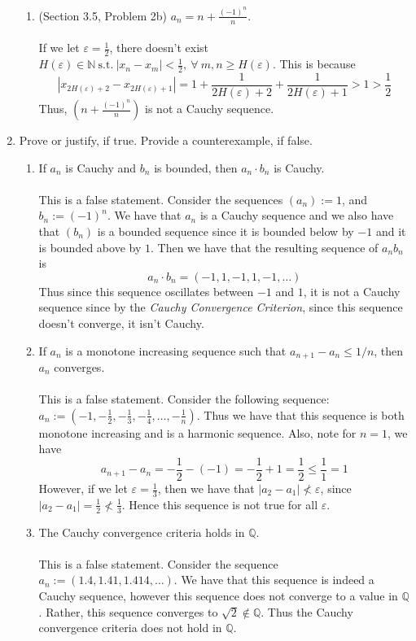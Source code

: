 \documentclass[12pt,letterpaper]{article}
\newcommand{\st}{\ \text{s.t.}\ }
\newcommand{\abs}[1]{\left\lvert #1 \right\rvert}
\newcommand{\N}{\mathbb{N}}
\newcommand{\Q}{\mathbb{Q}}
\theoremstyle{case}
\theoremstyle{definition}
\begin{document}
\begin{enumerate}
\begin{enumerate}
			\item (Section 3.5, Problem 2b) $a_n=n+\frac{(-1)^n}{n}$.
			\\\\If we let $\varepsilon=\frac{1}{2}$, there doesn't exist $H(\varepsilon) \in \N \st |x_n-x_m|<\frac{1}{2},\ \forall\ m,n \geq H(\varepsilon)$. This is because 
			\[\abs{x_{2H(\varepsilon)+2}-x_{2H(\varepsilon)+1}} = 1 + \frac{1}{2H(\varepsilon)+2}+\frac{1}{2H(\varepsilon)+1}>1>\frac{1}{2}\]
			Thus, $\left(n+\frac{(-1)^n}{n}\right)$ is not a Cauchy sequence.\\
		\end{enumerate}
		
		\item Prove or justify, if true. Provide a counterexample, if false.
		\begin{enumerate}
			\item If $a_n$ is Cauchy and $b_n$ is bounded, then $a_n \cdot b_n$ is Cauchy.
			\\\\This is a false statement. Consider the sequences $(a_n):=1$, and $b_n:=(-1)^n$. We have that $a_n$ is a Cauchy sequence and we also have that $(b_n)$ is a bounded sequence since it is bounded below by $-1$ and it is bounded above by $1$. Then we have that the resulting sequence of $a_nb_n$ is 
			\[a_n \cdot b_n = (-1,1,-1,1,-1, \dots)\]
			Thus since this sequence oscillates between $-1$ and $1$, it is not a Cauchy sequence since by the \textit{Cauchy Convergence Criterion}, since this sequence doesn't converge, it isn't Cauchy.
			
			\item If $a_n$ is a monotone increasing sequence such that $a_{n+1}-a_n \leq 1/n$, then $a_n$ converges.
			\\\\This is a false statement. Consider the following sequence: $a_n:=(-1, -\frac{1}{2}, -\frac{1}{3}, -\frac{1}{4}, \dots, -\frac{1}{n})$. Thus we have that this sequence is both monotone increasing and is a harmonic sequence. Also, note for $n=1$, we have
			\[a_{n+1}-a_n = -\frac{1}{2}-(-1)= -\frac{1}{2}+1=\frac{1}{2} \leq \frac{1}{1}=1\]
			However, if we let $\varepsilon=\frac{1}{3}$, then we have that $|a_2-a_1| \nless \varepsilon$, since $|a_2-a_1|=\frac{1}{2} \nless \frac{1}{3}$. Hence this sequence is not true for all $\varepsilon$.
			
			\item The Cauchy convergence criteria holds in $\Q$.
			\\\\This is a false statement. Consider the sequence $a_n:= (1.4,1.41,1.414, \dots)$. We have that this sequence is indeed a Cauchy sequence, however this sequence does not converge to a value in $\Q$. Rather, this sequence converges to $\sqrt{2} \notin \Q$. Thus the Cauchy convergence criteria does not hold in $\Q$.
		\end{enumerate}
		
	\end{enumerate}
\end{document}

